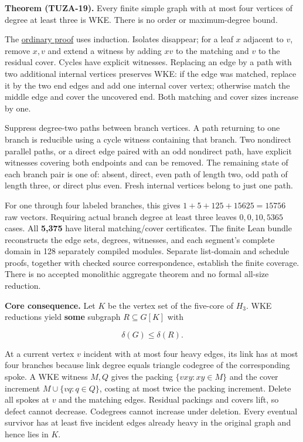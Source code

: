 \documentclass[11pt,a4paper]{article}
\begin{document}
\textbf{Theorem (TUZA-19).} Every finite simple graph with at most four vertices of degree at least three is WKE. There is no order or maximum-degree bound.

The \href{https://github.com/pappa211/ai-math-experiments/blob/main/problems/TUZA-19/notes/root_four_branch_wke.md}{ordinary proof} uses induction. Isolates disappear; for a leaf \(x\) adjacent to \(v\), remove \(x,v\) and extend a witness by adding \(xv\) to the matching and \(v\) to the residual cover. Cycles have explicit witnesses. Replacing an edge by a path with two additional internal vertices preserves WKE: if the edge was matched, replace it by the two end edges and add one internal cover vertex; otherwise match the middle edge and cover the uncovered end. Both matching and cover sizes increase by one.

Suppress degree-two paths between branch vertices. A path returning to one branch is reducible using a cycle witness containing that branch. Two nondirect parallel paths, or a direct edge paired with an odd nondirect path, have explicit witnesses covering both endpoints and can be removed. The remaining state of each branch pair is one of: absent, direct, even path of length two, odd path of length three, or direct plus even. Fresh internal vertices belong to just one path.

For one through four labeled branches, this gives \(1+5+125+15625=15756\) raw vectors. Requiring actual branch degree at least three leaves \(0,0,10,5365\) cases. All \textbf{5,375} have literal matching/cover certificates. The finite Lean bundle reconstructs the edge sets, degrees, witnesses, and each segment's complete domain in 128 separately compiled modules. Separate list-domain and schedule proofs, together with checked source correspondence, establish the finite coverage. There is no accepted monolithic aggregate theorem and no formal all-size reduction.

\textbf{Core consequence.} Let \(K\) be the vertex set of the five-core of \(H_3\). WKE reductions yield \textbf{some} subgraph \(R\subseteq G[K]\) with

\[\delta(G)\le\delta(R).\]

At a current vertex \(v\) incident with at most four heavy edges, its link has at most four branches because link degree equals triangle codegree of the corresponding spoke. A WKE witness \(M,Q\) gives the packing \(\{vxy:xy\in M\}\) and the cover increment \(M\cup\{vq:q\in Q\}\), costing at most twice the packing increment. Delete all spokes at \(v\) and the matching edges. Residual packings and covers lift, so defect cannot decrease. Codegrees cannot increase under deletion. Every eventual survivor has at least five incident edges already heavy in the original graph and hence lies in \(K\).
\end{document}
